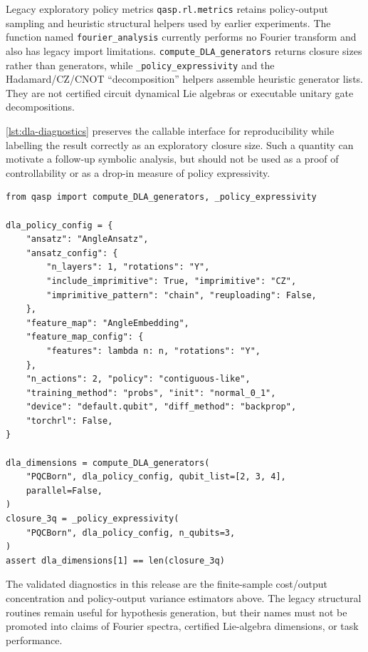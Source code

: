 \documentclass[10pt]{article}
\newcommand{\code}[1]{\texttt{#1}}
\begin{document}
\begin{qaspfeature}{Legacy exploratory policy metrics}
\code{qasp.rl.metrics} retains policy-output sampling and heuristic structural
helpers used by earlier experiments.  The function named
\code{fourier\_analysis} currently performs no Fourier transform and also has
legacy import limitations.  \code{compute\_DLA\_generators} returns closure
sizes rather than generators, while \code{\_policy\_expressivity} and the
Hadamard/CZ/CNOT ``decomposition'' helpers assemble heuristic generator lists.
They are not certified circuit dynamical Lie algebras or executable unitary
gate decompositions.
\end{qaspfeature}

\cref{lst:dla-diagnostics} preserves the callable interface for reproducibility
while labelling the result correctly as an exploratory closure size.  Such a
quantity can motivate a follow-up symbolic analysis, but should not be used as
a proof of controllability or as a drop-in measure of policy expressivity.
\begin{lstlisting}[caption={Exploratory Lie-closure sizes and elements from the legacy policy-metrics interface.},label={lst:dla-diagnostics}]
from qasp import compute_DLA_generators, _policy_expressivity

dla_policy_config = {
    "ansatz": "AngleAnsatz",
    "ansatz_config": {
        "n_layers": 1, "rotations": "Y",
        "include_imprimitive": True, "imprimitive": "CZ",
        "imprimitive_pattern": "chain", "reuploading": False,
    },
    "feature_map": "AngleEmbedding",
    "feature_map_config": {
        "features": lambda n: n, "rotations": "Y",
    },
    "n_actions": 2, "policy": "contiguous-like",
    "training_method": "probs", "init": "normal_0_1",
    "device": "default.qubit", "diff_method": "backprop",
    "torchrl": False,
}

dla_dimensions = compute_DLA_generators(
    "PQCBorn", dla_policy_config, qubit_list=[2, 3, 4],
    parallel=False,
)
closure_3q = _policy_expressivity(
    "PQCBorn", dla_policy_config, n_qubits=3,
)
assert dla_dimensions[1] == len(closure_3q)
\end{lstlisting}

The validated diagnostics in this release are the finite-sample cost/output
concentration and policy-output variance estimators above.  The legacy
structural routines remain useful for hypothesis generation, but their names
must not be promoted into claims of Fourier spectra, certified Lie-algebra
dimensions, or task performance.
\end{document}
